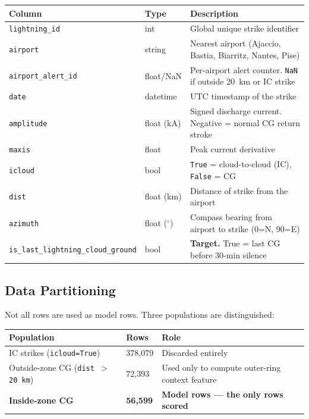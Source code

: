 \documentclass[12pt,a4paper]{article}
\begin{document}
\begin{center}
\begin{tabular}{L{3.2cm} L{2cm} L{8cm}}
\toprule
\textbf{Column} & \textbf{Type} & \textbf{Description} \\
\midrule
\texttt{lightning\_id}   & int    & Global unique strike identifier \\
\texttt{airport}         & string & Nearest airport (Ajaccio, Bastia, Biarritz, Nantes, Pise) \\
\texttt{airport\_alert\_id} & float/NaN & Per-airport alert counter. \texttt{NaN} if outside 20~km or IC strike \\
\texttt{date}            & datetime & UTC timestamp of the strike \\
\texttt{amplitude}       & float (kA) & Signed discharge current. Negative = normal CG return stroke \\
\texttt{maxis}           & float  & Peak current derivative \\
\texttt{icloud}          & bool   & \texttt{True} = cloud-to-cloud (IC), \texttt{False} = CG \\
\texttt{dist}            & float (km) & Distance of strike from the airport \\
\texttt{azimuth}         & float ($^\circ$) & Compass bearing from airport to strike (0=N, 90=E) \\
\texttt{is\_last\_lightning\_cloud\_ground} & bool & \textbf{Target.} True = last CG before 30-min silence \\
\bottomrule
\end{tabular}
\end{center}

\subsection{Data Partitioning}

Not all rows are used as model rows. Three populations are distinguished:

\begin{center}
\begin{tabular}{L{4cm} C{2cm} L{7cm}}
\toprule
\textbf{Population} & \textbf{Rows} & \textbf{Role} \\
\midrule
IC strikes (\texttt{icloud=True}) & 378,079 & Discarded entirely \\
Outside-zone CG (\texttt{dist $>$ 20~km}) & 72,393 & Used only to compute outer-ring context feature \\
\textbf{Inside-zone CG} & \textbf{56,599} & \textbf{Model rows --- the only rows scored} \\
\bottomrule
\end{tabular}
\end{center}
\end{document}
